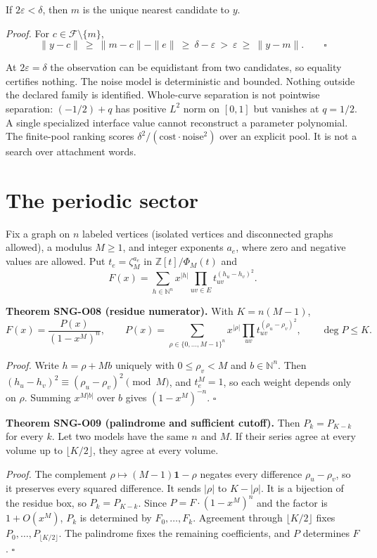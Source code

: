 \documentclass[
  11pt,
  a4paper,
]{report}
\begin{document}
If \(2\varepsilon<\delta\), then \(m\) is the unique nearest candidate
to \(y\).

\emph{Proof.} For \(c\in\mathcal F\setminus\{m\}\), \[
\|y-c\|\ \ge\ \|m-c\|-\|e\|\ \ge\ \delta-\varepsilon\ >\ \varepsilon\ \ge\ \|y-m\| .\qquad\square
\]

At \(2\varepsilon=\delta\) the observation can be equidistant from two
candidates, so equality certifies nothing. The noise model is
deterministic and bounded. Nothing outside the declared family is
identified. Whole-curve separation is not pointwise separation:
\((-1/2)+q\) has positive \(L^2\) norm on \([0,1]\) but vanishes at
\(q=1/2\). A single specialized interface value cannot reconstruct a
parameter polynomial. The finite-pool ranking scores
\(\delta^2/(\text{cost}\cdot\text{noise}^2)\) over an explicit pool. It
is not a search over attachment words.

\hypertarget{the-periodic-sector}{%
\section{The periodic sector}\label{the-periodic-sector}}

Fix a graph on \(n\) labeled vertices (isolated vertices and
disconnected graphs allowed), a modulus \(M\ge1\), and integer exponents
\(a_e\), where zero and negative values are allowed. Put
\(t_e=\zeta_M^{a_e}\) in \(\mathbb Z[t]/\Phi_M(t)\) and \[
F(x)=\sum_{h\in\mathbb N^n}x^{|h|}\prod_{uv\in E}t_{uv}^{(h_u-h_v)^2}.
\]

\textbf{Theorem SNG-O08 (residue numerator).} With \(K=n(M-1)\), \[
F(x)=\frac{P(x)}{(1-x^M)^n},\qquad
P(x)=\sum_{\rho\in\{0,\ldots,M-1\}^n}x^{|\rho|}\prod_{uv}t_{uv}^{(\rho_u-\rho_v)^2},\qquad \deg P\le K .
\]

\emph{Proof.} Write \(h=\rho+Mb\) uniquely with \(0\le\rho_v<M\) and
\(b\in\mathbb N^n\). Then \((h_u-h_v)^2\equiv(\rho_u-\rho_v)^2\pmod M\),
and \(t_e^M=1\), so each weight depends only on \(\rho\). Summing
\(x^{M|b|}\) over \(b\) gives \((1-x^M)^{-n}\). \(\square\)

\textbf{Theorem SNG-O09 (palindrome and sufficient cutoff).} Then
\(P_k=P_{K-k}\) for every \(k\). Let two models have the same \(n\) and
\(M\). If their series agree at every volume up to
\(\lfloor K/2\rfloor\), they agree at every volume.

\emph{Proof.} The complement \(\rho\mapsto(M-1)\mathbf 1-\rho\) negates
every difference \(\rho_u-\rho_v\), so it preserves every squared
difference. It sends \(|\rho|\) to \(K-|\rho|\). It is a bijection of
the residue box, so \(P_k=P_{K-k}\). Since \(P=F\cdot(1-x^M)^n\) and the
factor is \(1+O(x^M)\), \(P_k\) is determined by \(F_0,\ldots,F_k\).
Agreement through \(\lfloor K/2\rfloor\) fixes
\(P_0,\ldots,P_{\lfloor K/2\rfloor}\). The palindrome fixes the
remaining coefficients, and \(P\) determines \(F\). \(\square\)
\end{document}
